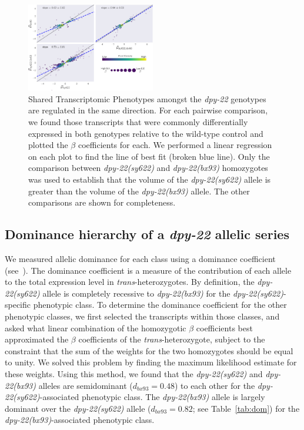 \documentclass[8pt, twocolumn]{article}
\newcommand{\gene}[1]{\mbox{\emph{#1}}}
\newcommand{\dpy}[1]{\gene{dpy-22#1}}
\newcommand{\bx}{\dpy{(bx93)}}
\newcommand{\sy}{\dpy{(sy622)}}
\begin{document}
\begin{figure}
  \includegraphics[width=0.5\textwidth]{../figs/dpy22-stps.pdf}
  \caption{
           Shared Transcriptomic Phenotypes amongst the \dpy{} genotypes are
           regulated in the same direction. For each pairwise comparison, we
           found those transcripts that were commonly differentially expressed
           in both genotypes relative to the wild-type control and plotted the
           $\beta$ coefficients for each. We performed a linear regression on
           each plot to find the line of best fit (broken blue line). Only the
           comparison between \sy{} and \bx{} homozygotes was used to establish
           that the volume of the \sy{} allele is greater than the volume of
           the \bx{} allele. The other comparisons are shown for completeness.
          }
\label{fig:stp}
\end{figure}

\subsection*{Dominance hierarchy of a \gene{dpy-22} allelic series}
We measured allelic dominance for each class using a dominance coefficient
(see~). The dominance coefficient is a measure of the
contribution of each allele to the total expression level in
\emph{trans}-heterozygotes. By definition, the \sy{} allele is completely
recessive to \bx{} for the \sy{}-specific phenotypic class. To determine the
dominance coefficient for the other phenotypic classes, we first selected the
transcripts within those classes, and asked what linear combination of the
homozygotic $\beta$ coefficients best approximated the $\beta$ coefficients of
the \emph{trans}-heterozygote, subject to the constraint that the sum of the
weights for the two homozygotes should be equal to unity. We solved this problem
by finding the maximum likelihood estimate for these weights. Using this method,
we found that the \sy{} and \bx{} alleles are semidominant ($d_{bx93} = 0.48$)
to each other for the \sy{}-associated phenotypic class. The \bx{} allele is
largely  dominant over the \sy{} allele ($d_{bx93}=0.82$; see
Table~\ref{tab:dom}) for the \bx{}-associated phenotypic class.
\end{document}
